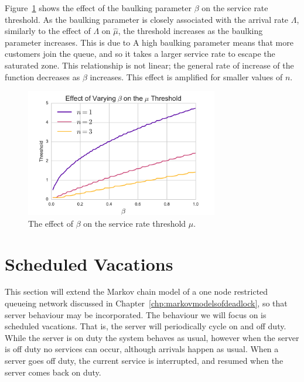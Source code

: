 \documentclass{article}
\begin{document}
Figure~\ref{fig:betathreshold} shows the effect of the baulking parameter $\beta$ on the service rate threshold.
As the baulking parameter is closely associated with the arrival rate $\Lambda$, similarly to the effect of $\Lambda$ on $\hat{\mu}$, the threshold increases as the baulking parameter increases.
This is due to A high baulking parameter means that more customers join the queue, and so it takes a larger service rate to escape the saturated zone.
This relationship is not linear; the general rate of increase of the function decreases as $\beta$ 
increases. This effect is amplified for smaller values of $n$.

\begin{figure}[!hbtp]
  \begin{center}
    \includegraphics[width=0.75\textwidth]{img/thresholdbeta_plot}
  \end{center}
  \caption{The effect of $\beta$ on the service rate threshold $\hat{\mu}$.}
  \label{fig:betathreshold}
\end{figure}



\section{Scheduled Vacations}

This section will extend the Markov chain model of a one node restricted queueing network discussed in Chapter~\ref{chp:markovmodelsofdeadlock}, so that server behaviour may be incorporated.
The behaviour we will focus on is scheduled vacations.
That is, the server will periodically cycle on and off duty.
While the server is on duty the system behaves as usual, however when the server is off duty no services can occur, although arrivals happen as usual.
When a server goes off duty, the current service is interrupted, and resumed when the server comes back on duty.
\end{document}
